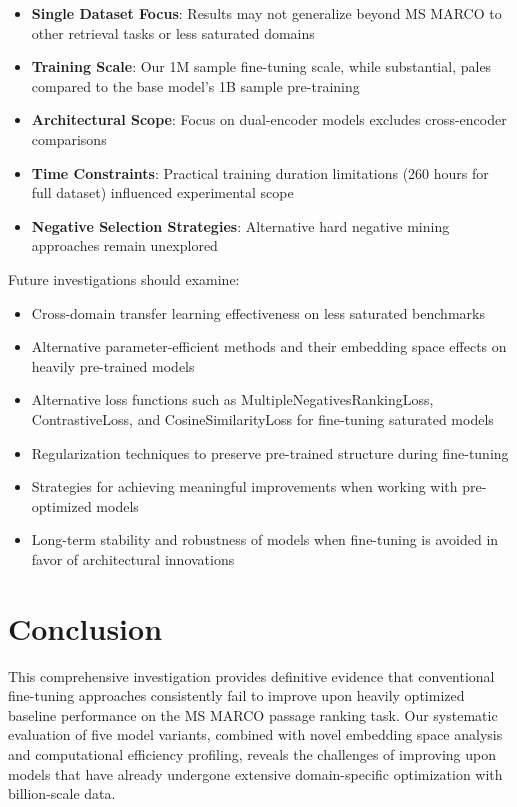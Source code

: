 \documentclass[conference]{IEEEtran}
\begin{document}
\begin{itemize}
\item \textbf{Single Dataset Focus}: Results may not generalize beyond MS MARCO to other retrieval tasks or less saturated domains
\item \textbf{Training Scale}: Our 1M sample fine-tuning scale, while substantial, pales compared to the base model's 1B sample pre-training
\item \textbf{Architectural Scope}: Focus on dual-encoder models excludes cross-encoder comparisons
\item \textbf{Time Constraints}: Practical training duration limitations (260 hours for full dataset) influenced experimental scope
\item \textbf{Negative Selection Strategies}: Alternative hard negative mining approaches remain unexplored
\end{itemize}

Future investigations should examine:
\begin{itemize}
\item Cross-domain transfer learning effectiveness on less saturated benchmarks
\item Alternative parameter-efficient methods and their embedding space effects on heavily pre-trained models
\item Alternative loss functions such as MultipleNegativesRankingLoss, ContrastiveLoss, and CosineSimilarityLoss for fine-tuning saturated models
\item Regularization techniques to preserve pre-trained structure during fine-tuning
\item Strategies for achieving meaningful improvements when working with pre-optimized models
\item Long-term stability and robustness of models when fine-tuning is avoided in favor of architectural innovations
\end{itemize}

\section{Conclusion}
This comprehensive investigation provides definitive evidence that conventional fine-tuning approaches consistently fail to improve upon heavily optimized baseline performance on the MS MARCO passage ranking task. Our systematic evaluation of five model variants, combined with novel embedding space analysis and computational efficiency profiling, reveals the challenges of improving upon models that have already undergone extensive domain-specific optimization with billion-scale data.
\end{document}
